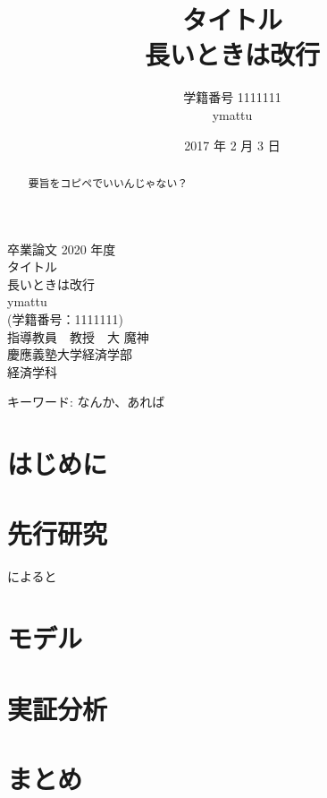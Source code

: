 \documentclass[11pt]{jsarticle}
\title{タイトル \\ 長いときは改行}
\author{学籍番号 1111111 \\ ymattu}
\date{2017 年 2 月 3 日}
\begin{document}
\begin{titlepage}
\begin{center}

 \LARGE{ 卒業論文} \hspace{\fill} \LARGE{2020 年度}\\

  \vspace{3cm}
 {\fontsize{20pt}{20pt}\selectfont
    タイトル \\ 長いときは改行
  }\\ %

  \vspace{2.5cm}
 {\fontsize{20pt}{20pt}\selectfont  ymattu} \\
 \LARGE{(学籍番号：1111111)} \\
  \vspace{3.5cm}
 \LARGE{指導教員　教授　大 魔神} \\
  \vspace{2cm}
 \LARGE{慶應義塾大学経済学部} \\
 \LARGE{経済学科} \\

\end{center}
\end{titlepage}


\newpage
 \thispagestyle{empty}

\begin{abstract}
 要旨をコピペでいいんじゃない？
\end{abstract}

\begin{center}
 キーワード: なんか、あれば
\end{center}

\newpage

\tableofcontents

\newpage
\listoffigures
\listoftables

\newpage
 \setcounter{page}{1}

\section{はじめに}

\section{先行研究}
\citet{rosenbaum1983central}によると

\section{モデル}

\section{実証分析}

\section{まとめ}


\newpage


\end{document}
